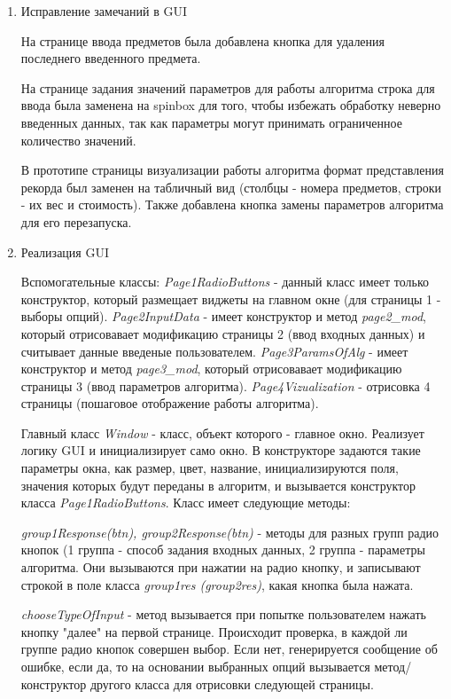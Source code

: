 \documentclass{article}
\begin{document}
\begin{enumerate}
\item Исправление замечаний в GUI

На странице ввода предметов была добавлена кнопка для удаления последнего введенного предмета.

На странице задания значений параметров для работы алгоритма строка для ввода была заменена на spinbox для того, чтобы избежать обработку неверно введенных данных, так как параметры могут принимать ограниченное количество значений.

В прототипе страницы визуализации работы алгоритма формат представления рекорда был заменен на табличный вид (столбцы - номера предметов, строки - их вес и стоимость). Также добавлена кнопка замены параметров алгоритма для его перезапуска.

\item Реализация GUI

Вспомогательные классы: \textit{Page1RadioButtons} -  данный класс имеет только конструктор, который размещает виджеты на главном окне (для страницы 1 - выборы опций). \textit{Page2InputData} - имеет конструктор и метод \textit{page2\_mod}, который отрисовавает модификацию страницы 2 (ввод входных данных) и считывает данные введеные пользователем. \textit{Page3ParamsOfAlg} - имеет конструктор и метод \textit{page3\_mod}, который отрисовавает модификацию страницы 3 (ввод параметров алгоритма). \textit{Page4Vizualization} - отрисовка 4 страницы (пошаговое отображение работы алгоритма).

Главный класс \textit{Window} - класс, объект которого - главное окно. Реализует логику GUI и инициализирует само окно. В конструкторе задаются такие параметры окна, как размер, цвет, название, инициализируются поля, значения которых будут переданы в алгоритм, и вызывается конструктор класса \textit{Page1RadioButtons}. Класс имеет следующие методы:

\textit{group1Response(btn), group2Response(btn)} - методы для разных групп радио кнопок (1 группа - способ задания входных данных, 2 группа - параметры алгоритма. Они вызываются при нажатии на радио кнопку, и записывают строкой в поле класса \textit{group1res (group2res)}, какая кнопка была нажата. 

\textit{chooseTypeOfInput} - метод вызывается при попытке пользователем нажать кнопку "далее" на первой странице. Происходит проверка, в каждой ли группе радио кнопок совершен выбор. Если нет, генерируется сообщение об ошибке, если да, то на основании выбранных опций вызывается метод/конструктор другого класса для отрисовки следующей страницы.


\end{enumerate}
\end{document}
